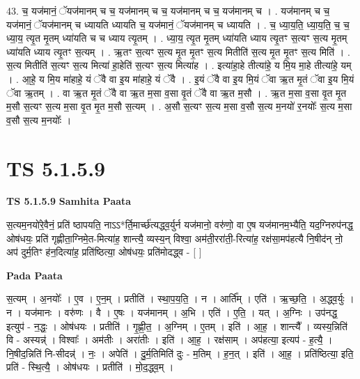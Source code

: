 \documentclass[17pt]{extarticle}
\begin{document}
43. च॒ यज॑मानं॒ ॅयज॑मानम् च च॒ यज॑मानम् च च॒ यज॑मानम् च च॒ यज॑मानम् च । . यज॑मानम् च च॒ यज॑मानं॒ ॅयज॑मानम् च ध्यायति ध्यायति च॒ यज॑मानं॒ ॅयज॑मानम् च ध्यायति । . च॒ ध्या॒य॒ति॒ ध्या॒य॒ति॒ च॒ च॒ ध्या॒य॒ त्यृ॒त मृ॒तम् ध्या॑यति च च ध्याय त्यृ॒तम् । . ध्या॒य॒ त्यृ॒त मृ॒तम् ध्या॑यति ध्याय त्यृ॒तꣳ स॒त्यꣳ स॒त्य मृ॒तम् ध्या॑यति ध्याय त्यृ॒तꣳ स॒त्यम् । . ऋ॒तꣳ स॒त्यꣳ स॒त्य मृ॒त मृ॒तꣳ स॒त्य मितीति॑ स॒त्य मृ॒त मृ॒तꣳ स॒त्य मिति॑ । . स॒त्य मितीति॑ स॒त्यꣳ स॒त्य मित्या॑ हा॒हेति॑ स॒त्यꣳ स॒त्य मित्या॑ह । . इत्या॑हा॒हे तीत्या॑हे॒ य मि॒य मा॒हे तीत्या॑हे॒ यम् । . आ॒हे॒ य मि॒य मा॑हाहे॒ यं ॅवै वा इ॒य मा॑हाहे॒ यं ॅवै । . इ॒यं ॅवै वा इ॒य मि॒यं ॅवा ऋ॒त मृ॒तं ॅवा इ॒य मि॒यं ॅवा ऋ॒तम् । . वा ऋ॒त मृ॒तं ॅवै वा ऋ॒त म॒सा व॒सा वृ॒तं ॅवै वा ऋ॒त म॒सौ । . ऋ॒त म॒सा व॒सा वृ॒त मृ॒त म॒सौ स॒त्यꣳ स॒त्य म॒सा वृ॒त मृ॒त म॒सौ स॒त्यम् । . अ॒सौ स॒त्यꣳ स॒त्य म॒सा व॒सौ स॒त्य म॒नयो॑ र॒नयोः᳚ स॒त्य म॒सा व॒सौ स॒त्य म॒नयोः᳚ । \newline
\pagebreak
{}

\section{ TS 5.1.5.9 }

\textbf{TS 5.1.5.9 } \newline
\textbf{Samhita Paata} \newline

स॒त्यम॒नयो॑रे॒वैनं॒ प्रति॑ ष्ठापयति॒ नाऽऽ*र्ति॒मार्च्छ॑त्यद्ध्व॒र्युर्न यज॑मानो॒ वरु॑णो॒ वा ए॒ष यज॑मानम॒भ्यैति॒ यद॒ग्निरुप॑नद्ध॒ ओष॑धयः॒ प्रति॑ गृह्णीता॒ग्निमे॒त-मित्या॑ह॒ शान्त्यै॒ व्यस्य॒न् विश्वा॒ अम॑ती॒ररा॑ती॒-रित्या॑ह॒ रक्ष॑सा॒मप॑हत्यै नि॒षीद॑न् नो॒ अप॑ दुर्म॒तिꣳ ह॑न॒दित्या॑ह॒ प्रति॑ष्ठित्या॒ ओष॑धयः॒ प्रति॑मोदद्ध्व - [  ] \newline

\textbf{Pada Paata} \newline

स॒त्यम् । अ॒नयोः᳚ । ए॒व । ए॒न॒म् । प्रतीति॑ । स्था॒प॒य॒ति॒ । न । आर्ति᳚म् । एति॑ । ऋ॒च्छ॒ति॒ । अ॒द्ध्व॒र्युः । न । यज॑मानः । वरु॑णः । वै । ए॒षः । यज॑मानम् । अ॒भि । एति॑ । ए॒ति॒ । यत् । अ॒ग्निः । उप॑नद्ध॒ इत्युप॑ - न॒द्धः॒ । ओष॑धयः । प्रतीति॑ । गृ॒ह्णी॒त॒ । अ॒ग्निम् । ए॒तम् । इति॑ । आ॒ह॒ । शान्त्यै᳚ । व्यस्य॒न्निति॑ वि - अस्यन्न्॑ । विश्वाः᳚ । अम॑तीः । अरा॑तीः । इति॑ । आ॒ह॒ । रक्ष॑साम् । अप॑हत्या॒ इत्यप॑ - ह॒त्यै॒ । नि॒षीद॒न्निति॑ नि-सीदन्न्॑ । नः॒ । अपेति॑ । दु॒र्म॒तिमिति॑ दुः - म॒तिम् । ह॒न॒त् । इति॑ । आ॒ह॒ । प्रति॑ष्ठित्या॒ इति॒ प्रति॑ - स्थि॒त्यै॒ । ओष॑धयः । प्रतीति॑ । मो॒द॒द्ध्व॒म् ।  \newline
\end{document}
